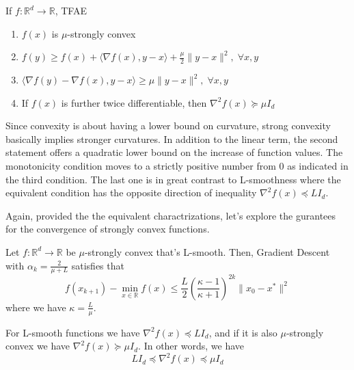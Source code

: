 \begin{lemma}
    If $f: \mathbb{R}^d \rightarrow \mathbb{R}$, TFAE
    \begin{enumerate}
        \item $f(x)$ is $\mu$-strongly convex
        \item $f(y) \geq f(x) + \langle \nabla f(x), y-x \rangle + \frac{\mu}{2}\|y-x\|^2, \; \forall x,y$
        \item $\langle \nabla f(y) - \nabla f(x), y-x \rangle \geq \mu \|y-x\|^2, \; \forall x,y$
        \item If $f(x)$ is further twice differentiable, then $\nabla^2f(x) \succeq \mu I_d$
    \end{enumerate}
\end{lemma}
\begin{remark}
    Since convexity is about having a lower bound on curvature, strong convexity basically implies stronger curvatures. In addition to the linear term, the second statement offers a quadratic lower bound on the increase of function values. The monotonicity condition moves to a strictly positive number from 0 as indicated in the third condition. The last one is in great contrast to L-smoothness where the equivalent condition has the opposite direction of inequality $\nabla^2 f(x) \preceq LI_d$.
\end{remark}

Again, provided the the equivalent charactrizations, let's explore the gurantees for the convergence of strongly convex functions.

\begin{theorem}\label{thm:LSmoothStronglyConvexConvergenceGuarantee}
    Let $f: \mathbb{R}^d \rightarrow \mathbb{R}$ be $\mu$-strongly convex that's L-smooth. Then, Gradient Descent with $\alpha_k = \frac{2}{\mu + L}$ satisfies that 
    \begin{equation*}
        f(x_{k+1}) - \min_{x \in \mathbb{R}} f(x) \leq \frac{L}{2}(\frac{\kappa - 1}{\kappa + 1})^{2k} \|x_0 - x^*\|^2
    \end{equation*}
    where we have $\kappa = \frac{L}{\mu}$.
\end{theorem}
\begin{remark}
    For L-smooth functions we have $\nabla^2f(x) \preceq LI_d$, and if it is also $\mu$-strongly convex we have $\nabla^2 f(x) \succeq \mu I_d$. In other words, we have
    \begin{equation*}
        LI_d \preceq \nabla^2f(x) \preceq \mu I_d
    \end{equation*}
\end{remark}


